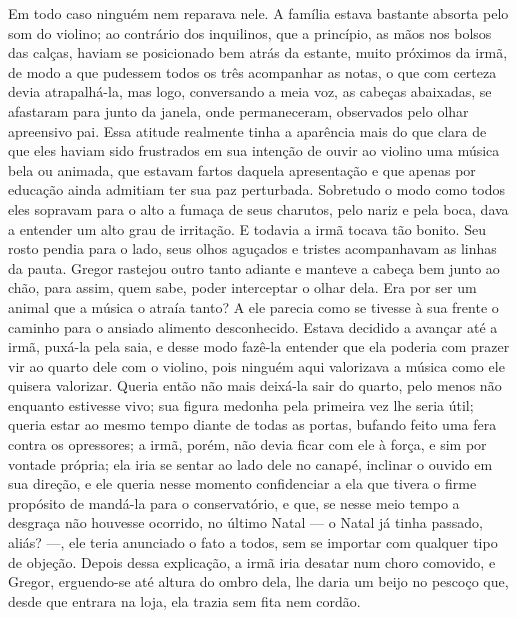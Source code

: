 Em todo caso ninguém nem reparava nele. A família estava bastante absorta
pelo som do violino; ao contrário dos inquilinos, que a princípio, as mãos
nos bolsos das calças, haviam se posicionado bem atrás da estante, muito
próximos da irmã, de modo a que pudessem todos os três acompanhar as
notas, o que com certeza devia atrapalhá-la, mas logo, conversando a meia
voz, as cabeças abaixadas, se afastaram para junto da janela, onde
permaneceram, observados pelo olhar apreensivo pai. Essa atitude realmente
tinha a aparência mais do que clara de que eles haviam sido frustrados em
sua intenção de ouvir ao violino uma música bela ou animada, que estavam
fartos daquela apresentação e que apenas por educação ainda admitiam ter
sua paz perturbada. Sobretudo o modo como todos eles sopravam para o alto
a fumaça de seus charutos, pelo nariz e pela boca, dava a entender um alto
grau de irritação. E todavia a irmã tocava tão bonito. Seu rosto pendia
para o lado, seus olhos aguçados e tristes acompanhavam as linhas da
pauta. Gregor rastejou outro tanto adiante e manteve a cabeça bem junto ao
chão, para assim, quem sabe, poder interceptar o olhar dela. Era por ser
um animal que a música o atraía tanto? A ele parecia como se tivesse à sua
frente o caminho para o ansiado alimento desconhecido. Estava decidido a
avançar até a irmã, puxá-la pela saia, e desse modo fazê-la entender que
ela poderia com prazer vir ao quarto dele com o violino, pois ninguém aqui
valorizava a música como ele quisera valorizar. Queria então não mais
deixá-la sair do quarto, pelo menos não enquanto estivesse vivo; sua
figura medonha pela primeira vez lhe seria útil; queria estar ao mesmo
tempo diante de todas as portas, bufando feito uma fera contra os
opressores; a irmã, porém, não devia ficar com ele à força, e sim por
vontade própria; ela iria se sentar ao lado dele no canapé, inclinar o
ouvido em sua direção, e ele queria nesse momento confidenciar a ela que
tivera o firme propósito de mandá-la para o conservatório, e que, se nesse
meio tempo a desgraça não houvesse ocorrido, no último Natal --- o Natal já
tinha passado, aliás? ---, ele teria anunciado o fato a todos, sem se
importar com qualquer tipo de objeção. Depois dessa explicação, a irmã
iria desatar num choro comovido, e Gregor, erguendo-se até altura do ombro
dela, lhe daria um beijo no pescoço que, desde que entrara na loja, ela
trazia sem fita nem cordão.

